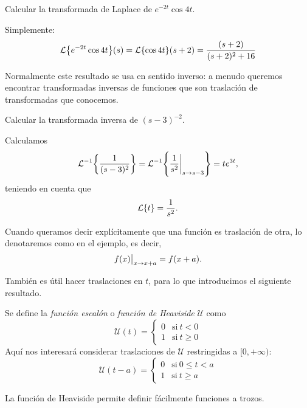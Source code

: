 \documentclass[../ecuaciones_diferenciales.tex]{subfiles}
\begin{document}
\begin{example}
	Calcular la transformada de Laplace de \(e^{-2t} \cos 4t\).
\end{example}

\begin{solution}
	Simplemente:
	\[\laplace\left\{e^{-2t} \cos 4t\right\}(s) = \laplace\{\cos 4t\}(s+2)
		= \frac{(s+2)}{(s+2)^2+16}\]
\end{solution}

Normalmente este resultado se usa en sentido inverso: a menudo queremos
encontrar transformadas inversas de funciones que son traslación de
transformadas que conocemos.

\begin{example}
	Calcular la transformada inversa de \((s-3)^{-2}\).
\end{example}

\begin{solution}
	Calculamos
	\[\laplace^{-1}\left\{\frac{1}{(s-3)^2}\right\} = \laplace^{-1}\left\{\restr{\frac{1}{s^2}}{s
			\to s-3}\right\} = te^{3t},\]
	teniendo en cuenta que
	\[\operatorname{\mathcal{L}}\{t\} = \frac{1}{s^2}.\]
\end{solution}

\begin{notation}
	Cuando queramos decir explícitamente que una función es
	traslación de otra, lo denotaremos como en el ejemplo, es decir,
	\[\restr{f(x)}{x \to x+a} = f(x+a).\]
\end{notation}

También es útil hacer traslaciones en \(t\), para lo que introducimos el
siguiente resultado.

\begin{definition}
	Se define la \emph{función escalón} o \emph{función de Heaviside} \(\mathcal{U}\) como
	\[\mathcal{U}(t) =
		\begin{cases}
			0 & \mathrm{si}\ t < 0    \\
			1 & \mathrm{si}\ t \geq 0
		\end{cases}
	\]
	Aquí nos interesará considerar traslaciones de \(\mathcal{U}\) restringidas a
	\([0,+\infty)\):
	\[\mathcal{U}(t-a) =
		\begin{cases}
			0 & \mathrm{si}\ 0 \leq t < a \\
			1 & \mathrm{si}\ t \geq a
		\end{cases}
	\]
\end{definition}

La función de Heaviside permite definir fácilmente funciones a trozos.
\end{document}
